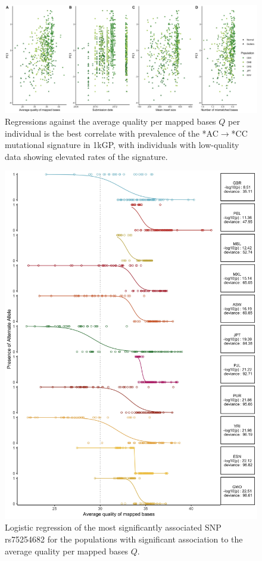 \documentclass[9pt,lineno]{elife}
\begin{document}
\begin{figure}[h]
\includegraphics[width=\hsize,keepaspectratio]{./Figures/PC1_Correlation.jpg}
\caption{Regressions against the average quality per mapped bases $Q$ per individual is the best correlate with prevalence of the  *AC${\rightarrow}$*CC mutational signature in 1kGP, with individuals with low-quality data showing elevated rates of the signature.  }
\label{PC1_Correlation}
\end{figure}

\begin{figure}[h]
\includegraphics[width=\hsize,keepaspectratio]{./Figures/RegressionPlot_mostSig2.jpg}
\caption{Logistic regression of the most significantly associated SNP rs75254682 for the populations with significant association to the average quality per mapped bases $Q$.}
\label{MostSig}
\end{figure}
\end{document}
